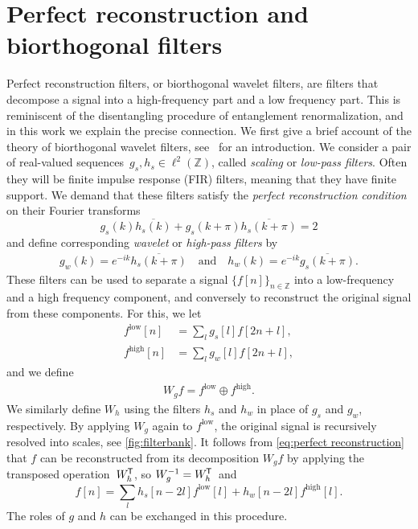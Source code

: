 \documentclass[submission, Phys]{SciPost}
\theoremstyle{definition}
\theoremstyle{remark}
\newcommand{\ZZ}{\mathbb Z}
\newcommand{\op}{\oplus}
\newcommand*{\tran}{{\mkern-1.5mu\mathsf{T}}}
\begin{document}
\section{Perfect reconstruction and biorthogonal filters}\label{sec:pir}
Perfect reconstruction filters, or biorthogonal wavelet filters, are filters that decompose a signal into a high-frequency part and a low frequency part.
This is reminiscent of the disentangling procedure of entanglement renormalization, and in this work we explain the precise connection.
We first give a brief account of the theory of biorthogonal wavelet filters, see~\cite{mallat2008wavelet} for an introduction.
We consider a pair of real-valued sequences~$g_s, h_s \in \ell^2(\ZZ)$, called \emph{scaling} or \emph{low-pass filters}.
Often they will be finite impulse response (FIR) filters, meaning that they have finite support.
We demand that these filters satisfy the \emph{perfect reconstruction condition} on their Fourier transforms
\begin{equation}\label{eq:perfect reconstruction}
  g_s(k)\overline{h_s(k)} + g_s(k + \pi)\overline{h_s(k + \pi)} = 2
\end{equation}
and define corresponding \emph{wavelet} or \emph{high-pass filters} by
\begin{align}\label{eq:scaling vs wavelet}
  g_w(k) = e^{-ik}\overline{h_s(k + \pi)} \quad \text{and} \quad h_w(k) = e^{-ik}\overline{g_s(k + \pi)}.
\end{align}
These filters can be used to separate a signal $\{f[n]\}_{n \in \ZZ}$ into a low-frequency and a high frequency component, and conversely to reconstruct the original signal from these components.
For this, we let %
\begin{align*}
  f^{\text{low}}[n] &= \sum_l g_s[l]f[2n + l], \\
  f^{\text{high}}[n] &= \sum_l g_w[l]f[2n + l],
\end{align*}
and we define
\begin{align*}
  W_g f = f^{\text{low}} \op f^{\text{high}}.
\end{align*}
We similarly define $W_h$ using the filters $h_s$ and $h_w$ in place of $g_s$ and $g_w$, respectively.
By applying $W_g$ again to $f^{\text{low}}$, the original signal is recursively resolved into scales, see \cref{fig:filterbank}.
It follows from \cref{eq:perfect reconstruction} that $f$ can be reconstructed from its decomposition $W_g f$ by applying the transposed operation~$W_h^{\tran}$, so $W_g^{-1} = W_h^\tran$~and
\begin{equation*}
  f[n] = \sum_l h_s[n - 2l]f^{\text{low}}[l] + h_w[n - 2l]f^{\text{high}}[l].
\end{equation*}
The roles of $g$ and $h$ can be exchanged in this procedure.
\end{document}

